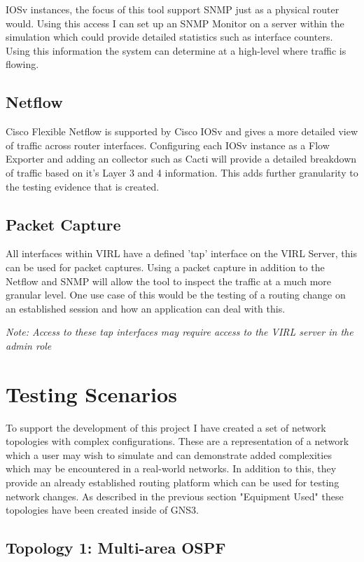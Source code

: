 \documentclass[11pt]{report}
\begin{document}
IOSv instances, the focus of this tool support SNMP just as a physical router would. Using this access I can set up an SNMP Monitor on a server within the simulation which could provide detailed statistics such as interface counters. Using this information the system can determine at a high-level where traffic is flowing.

\subsection{Netflow}

Cisco Flexible Netflow is supported by Cisco IOSv and gives a more detailed view of traffic across router interfaces. Configuring each IOSv instance as a Flow Exporter and adding an collector such as Cacti will provide a detailed breakdown of traffic based on it's Layer 3 and 4 information. This adds further granularity to the testing evidence that is created.

\subsection{Packet Capture}

All interfaces within VIRL have a defined 'tap' interface on the VIRL Server, this can be used for packet captures. Using a packet capture in addition to the Netflow and SNMP will allow the tool to inspect the traffic at a much more granular level. One use case of this would be the testing of a routing change on an established session and how an application can deal with this.

\textit{Note: Access to these tap interfaces may require access to the VIRL server in the admin role}
 

\section{Testing Scenarios}

To support the development of this project I have created a set of network topologies with complex configurations. These are a representation of a network which a user may wish to simulate and can demonstrate added complexities which may be encountered in a real-world networks. In addition to this, they provide an already established routing platform which can be used for testing network changes. As described in the previous section "Equipment Used" these topologies have been created inside of GNS3.

\subsection{Topology 1: Multi-area OSPF}
\end{document}
